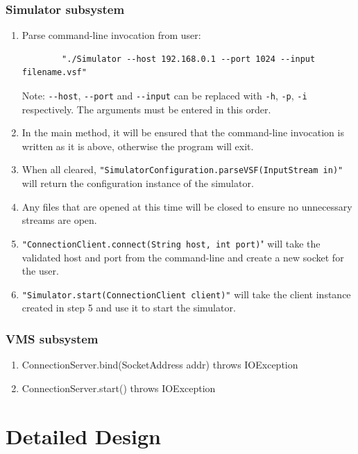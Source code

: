 \documentclass{article}
\begin{document}
\subsubsection{Simulator subsystem} %

\begin{enumerate}
  \item Parse command-line invocation from user: 
		\begin{verbatim}
		"./Simulator --host 192.168.0.1 --port 1024 --input filename.vsf"
		\end{verbatim}
		Note: \verb|--host|, \verb|--port| and \verb|--input| can be replaced with \verb|-h|, \verb|-p|, \verb|-i| respectively.
		\newline The arguments must be entered in this order.
  \item In the main method, it will be ensured that the command-line invocation is written as it is above, otherwise the program will exit.
  \item When all cleared, \verb|"SimulatorConfiguration.parseVSF(InputStream in)"| will return the configuration instance of the simulator.
  \item Any files that are opened at this time will be closed to ensure no unnecessary streams are open.
	\item \verb|"ConnectionClient.connect(String host, int port)|" will take the validated host and port from the command-line and create a new socket for the user.
	\item \verb|"Simulator.start(ConnectionClient client)"| will take the client instance created in step 5 and use it to start the simulator.	
\end{enumerate}

\subsubsection{VMS subsystem} %

\begin{enumerate}
  \item ConnectionServer.bind(SocketAddress addr) throws IOException
	\item ConnectionServer.start() throws IOException
\end{enumerate}

\break

\section{Detailed Design} %
\end{document}
